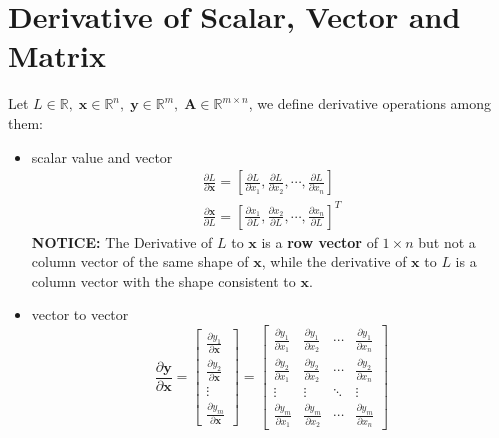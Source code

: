 \documentclass{article}
\newcommand{\Derivative}[2]{\ensuremath{\frac{\partial#1}{\partial#2}}}
\begin{document}
\section{Derivative of Scalar, Vector and Matrix}
Let $L\in\mathbb{R},\;\boldsymbol{x}\in\mathbb{R}^n,\;\boldsymbol{y}\in\mathbb{R}^m,\;\boldsymbol{A}\in\mathbb{R}^{m\times n}$, we define derivative operations among them:
\begin{itemize}
    \item scalar value and vector \begin{subequations}\begin{align}
        \Derivative{L}{\boldsymbol{x}}=\left[ 
            \Derivative{L}{x_1},\Derivative{L}{x_2},\cdots,\Derivative{L}{x_n}
        \right] \label{eq:derivative of scalar to vector}\\
        \Derivative{\boldsymbol{x}}{L}=\left[
            \Derivative{x_1}{L},\Derivative{x_2}{L},\cdots,\Derivative{x_n}{L}
        \right]^T\label{eq:derivative of vector to scalar}
    \end{align}
    \end{subequations}
    \textbf{NOTICE:} The Derivative of $L$ to $\boldsymbol{x}$ is a \textbf{row vector} of $1\times n$ but not a column vector of the same shape of $\boldsymbol{x}$, while the derivative of $\boldsymbol{x}$ to $L$ is a column vector with the shape consistent to $\boldsymbol{x}$.
    \item vector to vector \begin{equation}\label{eq:the derivative of vector to vector}
        \Derivative{\boldsymbol{y}}{\boldsymbol{x}}=\begin{bmatrix}
            \Derivative{y_1}{\boldsymbol{x}}\\
            \Derivative{y_2}{\boldsymbol{x}}\\
            \vdots\\
            \Derivative{y_m}{\boldsymbol{x}}
        \end{bmatrix}=\begin{bmatrix}
            \Derivative{y_1}{x_1}&\Derivative{y_1}{x_2}&\cdots&\Derivative{y_1}{x_n}\\
            \Derivative{y_2}{x_1}&\Derivative{y_2}{x_2}&\cdots&\Derivative{y_2}{x_n}\\
            \vdots&\vdots&\ddots&\vdots\\
            \Derivative{y_m}{x_1}&\Derivative{y_m}{x_2}&\cdots&\Derivative{y_m}{x_n}
        \end{bmatrix}
    \end{equation}

\end{itemize}
\end{document}
